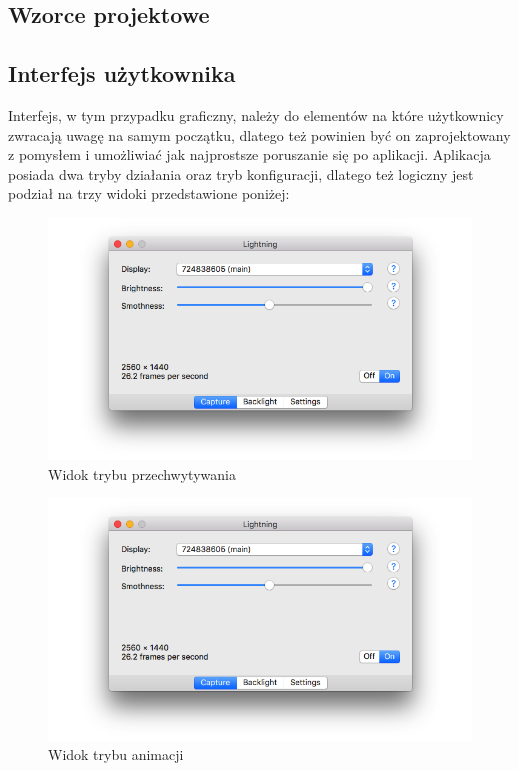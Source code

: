 \documentclass[12pt]{report}
\begin{document}












\subsection{Wzorce projektowe}













\subsection{Interfejs użytkownika}

Interfejs, w tym przypadku graficzny, należy do elementów na które użytkownicy zwracają uwagę na samym początku, dlatego też powinien być on zaprojektowany z pomysłem i umożliwiać jak najprostsze poruszanie się po aplikacji.
Aplikacja posiada dwa tryby działania oraz tryb konfiguracji, dlatego też logiczny jest podział na trzy widoki przedstawione poniżej:

\begin{figure}[h!]
\centering
\includegraphics[width=\textwidth]{../resources/capture.png}
\caption{Widok trybu przechwytywania}
\end{figure}

\begin{figure}[h!]
\centering
\includegraphics[width=\textwidth]{../resources/capture.png}
\caption{Widok trybu animacji}
\end{figure}
\end{document}
